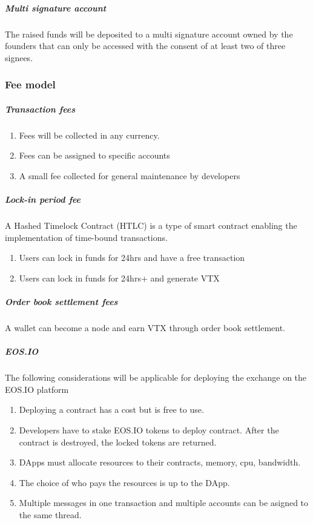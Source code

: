 \documentclass[]{article}
\begin{document}
\subparagraph{Multi signature account}
The raised funds will be deposited to a multi signature account owned by the founders 
that can only be accessed with the consent of at least two of three signees.


\subsubsection{Fee model}
\subparagraph{Transaction fees\\}
\begin{enumerate}
	\item Fees will be collected in any currency.\\
	\item Fees can be assigned to specific accounts\\
	\item A small fee collected for general maintenance by developers\\
\end{enumerate}
\subparagraph{Lock-in period fee\\}
	A Hashed Timelock Contract (HTLC)\cite{22} is a type of smart contract enabling the implementation of time-bound transactions.
\begin{enumerate}
	\item Users can lock in funds for 24hrs and have a free transaction\\
	\item Users can lock in funds for 24hrs+ and generate VTX \\
\end{enumerate}
\subparagraph{Order book settlement fees}
A wallet can become a node and earn VTX through order book settlement. 


\subparagraph{EOS.IO}
The following considerations will be applicable for deploying the exchange on the EOS.IO platform
\begin{enumerate}
\item Deploying a contract has a cost but is free to use. 
\item Developers have to stake EOS.IO tokens to deploy contract.
After the contract is destroyed, the locked tokens are returned.
\item DApps must allocate resources to their contracts, memory, cpu, bandwidth. 
\item The choice of who pays the resources is up to the DApp.
\item Multiple messages in one transaction and multiple accounts can be asigned to the same thread.

\end{enumerate}
\end{document}
